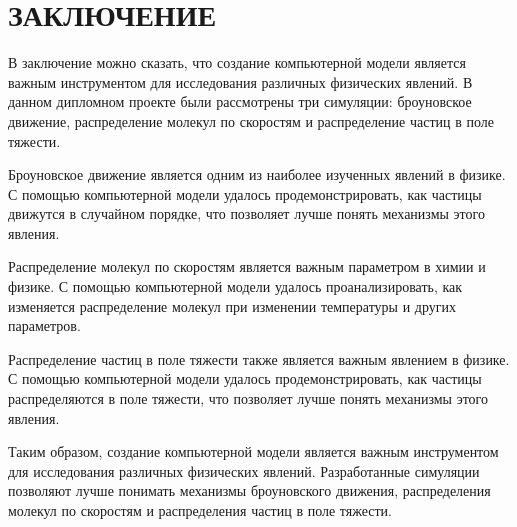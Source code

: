 \chapter*{ЗАКЛЮЧЕНИЕ}

В заключение можно сказать, что создание компьютерной модели является важным инструментом для исследования различных физических явлений. В данном дипломном проекте были рассмотрены три симуляции: броуновское движение, распределение молекул по скоростям и распределение частиц в поле тяжести.

Броуновское движение является одним из наиболее изученных явлений в физике. С помощью компьютерной модели удалось продемонстрировать, как частицы движутся в случайном порядке, что позволяет лучше понять механизмы этого явления.

Распределение молекул по скоростям является важным параметром в химии и физике. С помощью компьютерной модели удалось проанализировать, как изменяется распределение молекул при изменении температуры и других параметров.

Распределение частиц в поле тяжести также является важным явлением в физике. С помощью компьютерной модели удалось продемонстрировать, как частицы распределяются в поле тяжести, что позволяет лучше понять механизмы этого явления.

Таким образом, создание компьютерной модели является важным инструментом для исследования различных физических явлений. Разработанные симуляции позволяют лучше понимать механизмы броуновского движения, распределения молекул по скоростям и распределения частиц в поле тяжести.
